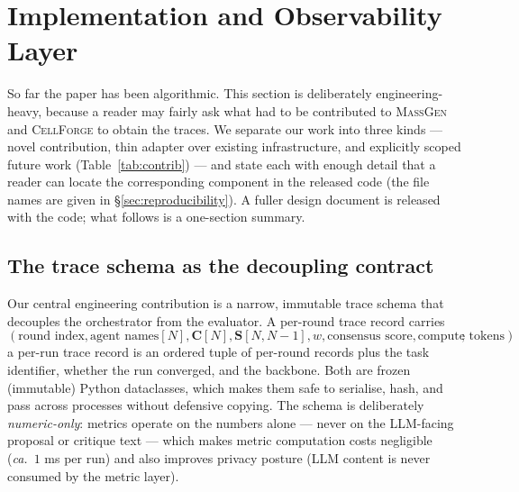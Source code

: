 \documentclass[10pt,a4paper]{article}
\begin{document}




\section{Implementation and Observability Layer}\label{sec:impl}

So far the paper has been algorithmic. This section is deliberately
engineering-heavy, because a reader may fairly ask what had to be contributed to
\textsc{MassGen} and \textsc{CellForge} to obtain the traces. We separate our work
into three kinds --- novel contribution, thin adapter over existing
infrastructure, and explicitly scoped future work
(Table~\ref{tab:contrib}) --- and state each with enough detail that a reader
can locate the corresponding component in the released code (the file names are
given in \S\ref{sec:reproducibility}). A fuller design document is released with the code;
what follows is a one-section summary.

\subsection{The trace schema as the decoupling contract}

Our central engineering contribution is a narrow, immutable trace schema
that decouples the orchestrator from the evaluator. A per-round trace record
carries
\[(\text{round index}, \text{agent names}[N],
\mathbf{C}[N], \mathbf{S}[N,N{-}1], w, \text{consensus score},
\text{compute tokens});\]
a per-run trace record is an ordered tuple of per-round records plus the task
identifier, whether the run converged, and the backbone. Both are frozen
(immutable) Python dataclasses, which makes them safe to serialise,
hash, and pass across processes without defensive copying. The schema is
deliberately \emph{numeric-only}: metrics operate on the numbers alone ---
never on the LLM-facing proposal or critique text --- which makes metric
computation costs negligible (\textit{ca.}\ $1$ ms per run) and also
improves privacy posture (LLM content is never consumed by the metric layer).
\end{document}
